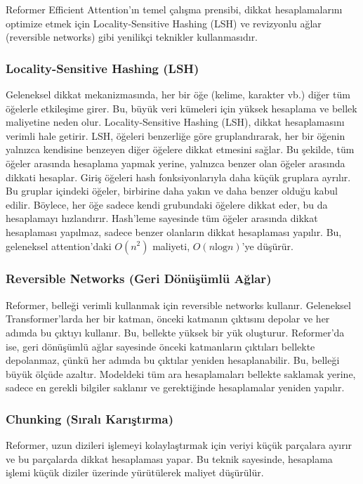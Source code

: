 Reformer Efficient Attention’ın temel çalışma prensibi, dikkat hesaplamalarını optimize etmek için Locality-Sensitive Hashing (LSH) ve revizyonlu ağlar (reversible networks) gibi yenilikçi teknikler kullanmasıdır.

\subsubsection{Locality-Sensitive Hashing (LSH)}

Geleneksel dikkat mekanizmasında, her bir öğe (kelime, karakter vb.) diğer tüm öğelerle etkileşime girer. Bu, büyük veri kümeleri için yüksek hesaplama ve bellek maliyetine neden olur. Locality-Sensitive Hashing (LSH), dikkat hesaplamasını verimli hale getirir. LSH, öğeleri benzerliğe göre gruplandırarak, her bir öğenin yalnızca kendisine benzeyen diğer öğelere dikkat etmesini sağlar. Bu şekilde, tüm öğeler arasında hesaplama yapmak yerine, yalnızca benzer olan öğeler arasında dikkati hesaplar. Giriş öğeleri hash fonksiyonlarıyla daha küçük gruplara ayrılır. Bu gruplar içindeki öğeler, birbirine daha yakın ve daha benzer olduğu kabul edilir. Böylece, her öğe sadece kendi grubundaki öğelere dikkat eder, bu da hesaplamayı hızlandırır. Hash'leme sayesinde tüm öğeler arasında dikkat hesaplaması yapılmaz, sadece benzer olanların dikkat hesaplaması yapılır. Bu, geleneksel attention'daki $O(n^2)$ maliyeti, $O(n \text{log} n)$'ye düşürür. 

\subsubsection{Reversible Networks (Geri Dönüşümlü Ağlar)}

Reformer, belleği verimli kullanmak için reversible networks kullanır. Geleneksel Transformer'larda her bir katman, önceki katmanın çıktısını depolar ve her adımda bu çıktıyı kullanır. Bu, bellekte yüksek bir yük oluşturur. Reformer'da ise, geri dönüşümlü ağlar sayesinde önceki katmanların çıktıları bellekte depolanmaz, çünkü her adımda bu çıktılar yeniden hesaplanabilir. Bu, belleği büyük ölçüde azaltır. Modeldeki tüm ara hesaplamaları bellekte saklamak yerine, sadece en gerekli bilgiler saklanır ve gerektiğinde hesaplamalar yeniden yapılır.

\subsubsection{Chunking (Sıralı Karıştırma)}

Reformer, uzun dizileri işlemeyi kolaylaştırmak için veriyi küçük parçalara ayırır ve bu parçalarda dikkat hesaplaması yapar. Bu teknik sayesinde, hesaplama işlemi küçük diziler üzerinde yürütülerek maliyet düşürülür.

